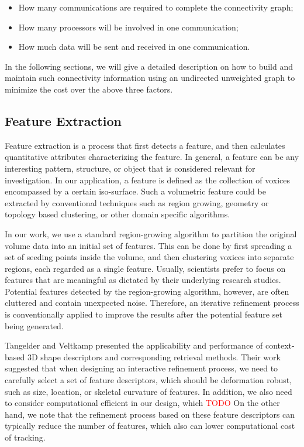 \documentclass[10pt, conference, compsocconf]{IEEEtran}
\begin{document}
\begin{itemize}
\item How many communications are required to complete the connectivity graph;
\item How many processors will be involved in one communication;
\item How much data will be sent and received in one communication.
\end{itemize}

In the following sections, we will give a detailed description on how to build and maintain such connectivity information using an undirected unweighted graph to minimize the cost over the above three factors.

\subsection{Feature Extraction}

Feature extraction is a process that first detects a feature, and then calculates quantitative attributes characterizing the feature. In general, a feature can be any interesting pattern, structure, or object that is considered relevant for investigation. In our application, a feature is defined as the collection of voxices encompassed by a certain iso-surface. Such a volumetric feature could be extracted by conventional techniques such as region growing, geometry or topology based clustering, or other domain specific algorithms.

In our work, we use a standard region-growing algorithm \cite{Huang2003} to partition the original volume data into an initial set of features. This can be done by first spreading a set of seeding points inside the volume, and then clustering voxices into separate regions, each regarded as a single feature. Usually, scientists prefer to focus on features that are meaningful as dictated by their underlying research studies. Potential features detected by the region-growing algorithm, however, are often cluttered and contain unexpected noise. Therefore, an iterative refinement process is conventionally applied to improve the results after the potential feature set being generated. 

Tangelder and Veltkamp \cite{Schlemmer2007} presented the applicability and performance of context-based 3D shape descriptors and corresponding retrieval methods. Their work suggested that when designing an interactive refinement process, we need to carefully select a set of feature descriptors, which should be deformation robust, such as size, location, or skeletal curvature of features. In addition, we also need to consider computational efficient in our design, which \textcolor{red}{TODO}
On the other hand, we note that the refinement process based on these feature descriptors can typically reduce the number of features, which also can lower computational cost of tracking.
\end{document}
